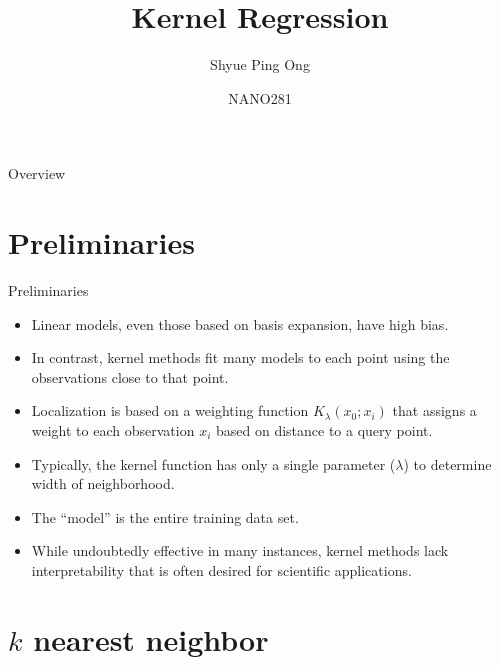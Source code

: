 \documentclass[aspectratio=169]{beamer}
\title[Kernel Regression]{Kernel Regression}
\author{Shyue Ping Ong}
\institute[UCSD]{University of California, San Diego\\
\medskip
}
\date{NANO281} %
\begin{document}
\begin{frame}
    \titlepage %
\end{frame}


\begin{frame}{Overview}
    \tableofcontents
\end{frame}


\section{Preliminaries}

\begin{frame}{Preliminaries}
    \begin{itemize}
        \item Linear models, even those based on basis expansion, have high bias.
        \item In contrast, kernel methods fit many models to each point using the observations close to that point.
        \item Localization is based on a weighting function $K_{\lambda}(x_0; x_i)$ that assigns a weight to each observation $x_i$ based on distance to a query point.
        \item Typically, the kernel function has only a single parameter ($\lambda$) to determine width of neighborhood.
        \item The ``model'' is the entire training data set.
        \item While undoubtedly effective in many instances, kernel methods lack interpretability that is often desired for scientific applications.
    \end{itemize}
\end{frame}

\section{$k$ nearest neighbor}
\end{document}
